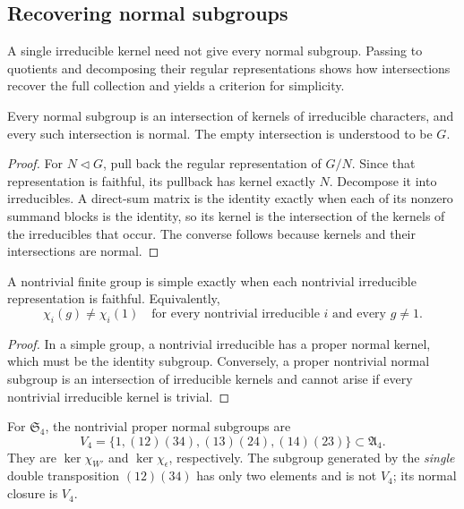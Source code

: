 \subsection{Recovering normal subgroups}

A single irreducible kernel need not give every normal subgroup. Passing to
quotients and decomposing their regular representations shows how
intersections recover the full collection and yields a criterion for
simplicity.

\begin{prop}
Every normal subgroup is an intersection of kernels of irreducible
characters, and every such intersection is normal. The empty intersection
is understood to be $G$.
\end{prop}
\begin{proof}
For $N\lhd G$, pull back the regular representation of $G/N$. Since
that representation is faithful, its pullback has kernel exactly $N$.
Decompose it into irreducibles. A direct-sum matrix is the identity
exactly when each of its nonzero summand blocks is the identity, so its
kernel is the intersection of the kernels of the irreducibles that occur.
The converse follows because kernels and their intersections are normal.
\end{proof}


\begin{cor}
A nontrivial finite group is simple exactly when each nontrivial irreducible
representation is faithful. Equivalently,
\[
 \chi_i(g)\ne\chi_i(1)\quad
 \text{for every nontrivial irreducible $i$ and every $g\ne1$}.
\]
\end{cor}
\begin{proof}
In a simple group, a nontrivial irreducible has a proper normal kernel,
which must be the identity subgroup. Conversely, a proper nontrivial
normal subgroup is an intersection of irreducible kernels and cannot
arise if every nontrivial irreducible kernel is trivial.
\end{proof}
For $\mathfrak S_4$, the nontrivial proper normal subgroups are
\[
 V_4=\{1,(12)(34),(13)(24),(14)(23)\}
       \subset\mathfrak A_4.
\]
They are $\ker\chi_{W'}$ and $\ker\chi_\epsilon$, respectively. The
subgroup generated by the \emph{single} double transposition $(12)(34)$
has only two elements and is not $V_4$; its normal closure is $V_4$.

